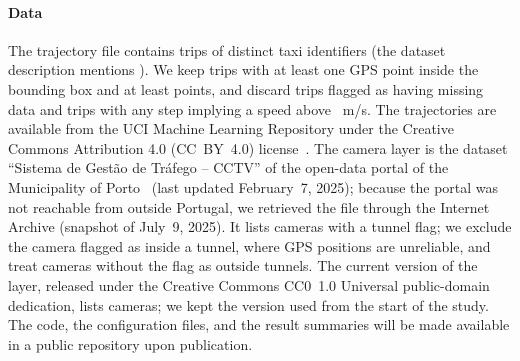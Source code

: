 \paragraph*{Data}
The trajectory file contains \numTripsFile{} trips of \numTaxisFile{} distinct taxi
identifiers (the dataset description mentions \numTaxisDescribed). We keep trips with
at least one GPS point inside the bounding box and at least \minTripPointsWord{}
points, and discard trips flagged as having missing data and trips with any step
implying a speed above \maxSpeed~m/s. The trajectories are available from the UCI
Machine Learning Repository under the Creative Commons Attribution 4.0
(CC~BY~4.0) license~\cite{porto2015data}. The camera layer is the dataset
``Sistema de Gest\~ao de Tr\'afego -- CCTV'' of the open-data portal of the
Municipality of Porto~\cite{porto2025cctv} (last updated February~7, 2025);
because the portal was not reachable from outside Portugal, we retrieved the file
through the Internet Archive (snapshot of July~9, 2025). It lists
\numCamerasRaw{} cameras with a tunnel flag; we exclude the
\numTunnelCamerasWord{} camera flagged as inside a tunnel, where GPS positions are
unreliable, and treat cameras without the flag as outside tunnels. The current
version of the layer, released under the Creative Commons CC0~1.0 Universal
public-domain dedication, lists \portalCamerasCurrent{} cameras; we kept the
version used from the start of the study. The code, the configuration files, and
the result summaries will be made available in a public repository upon
publication.

